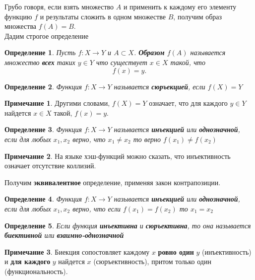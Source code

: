 \documentclass[]{article}
\theoremstyle{theorem}
\newtheorem{dfn}{Определение}
\theoremstyle{definition}
\newtheorem*{nt}{Примечание}
\begin{document}
	Грубо говоря, если взять множество $A$ и применить к каждому его элементу функцию $f$ и результаты сложить в одном множестве $B$, получим образ множества $f(A)=B.$
	\\
	
	Дадим строгое определение
	
	\begin{dfn}
		Пусть $f:X\rightarrow Y$ и $A\subset X$. \textbf{Образом} $f(A)$ называется множество \textbf{всех} таких $y\in Y$ что существует $x\in X$ такой, что $$f(x)=y.$$
	\end{dfn}
	
	\begin{dfn}
		Функция $f:X\rightarrow Y$ называется \textbf{сюръекцией}, если $f(X) = Y$
	\end{dfn}

	\begin{nt}
		Другими словами, $f(X) = Y$ означает, что для каждого $y\in Y$ найдется $x\in X$ такой, $f(x)=y$.
	\end{nt}

	\begin{dfn}
	Функция $f:X\rightarrow Y$ называется \textbf{инъекцией} или \textbf{однозначной}, если для любых $x_1, x_2$ верно, что $x_1\not=x_2$ то верно $f(x_1)\not=f(x_2)$
	\end{dfn}

	\begin{nt}
		На языке хэш-функций можно сказать, что инъективность означает отсутствие коллизий.
	\end{nt}
	
	Получим \textbf{эквивалентное} определение, применяя закон контрапозиции.
	
	\begin{dfn}
		Функция $f:X\rightarrow Y$ называется \textbf{инъекцией} или \textbf{однозначной}, если для любых $x_1, x_2$ верно, что если $f(x_1)=f(x_2)$ то $x_1=x_2$
	\end{dfn}

	\begin{dfn}
		Если функция \textbf{инъективна} и \textbf{сюръективна}, то она называется \textbf{биективной} или \textbf{взаимно-однозначной}
	\end{dfn}
	
	\begin{nt}
		Биекция сопостовляет каждому $x$ \textbf{ровно один} $y$ (инъективность) и \textbf{для каждого} $y$ найдется $x$ (сюръективность), притом только один (функциональность).
	\end{nt}
\end{document}
